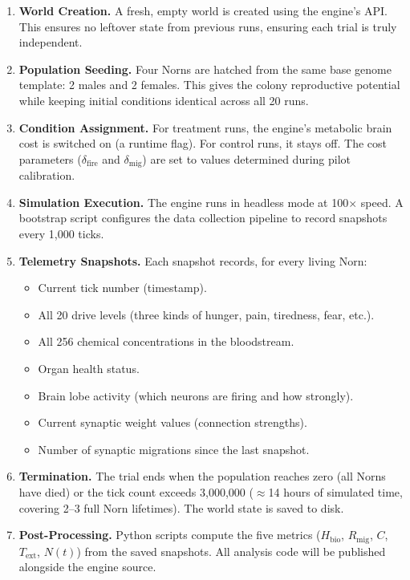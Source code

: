 \documentclass[12pt, a4paper]{article}
\newcommand{\Hbio}{H_{\mathrm{bio}}}
\newcommand{\Rmig}{R_{\mathrm{mig}}}
\begin{document}
\begin{enumerate}
  \item \textbf{World Creation.} A fresh, empty world is created using the engine's API. This ensures no leftover state from previous runs, ensuring each trial is truly independent.

  \item \textbf{Population Seeding.} Four Norns are hatched from the same base genome template: 2 males and 2 females. This gives the colony reproductive potential while keeping initial conditions identical across all 20 runs.

  \item \textbf{Condition Assignment.} For treatment runs, the engine's metabolic brain cost is switched on (a runtime flag). For control runs, it stays off. The cost parameters ($\delta_{\text{fire}}$ and $\delta_{\text{mig}}$) are set to values determined during pilot calibration.

  \item \textbf{Simulation Execution.} The engine runs in headless mode at 100$\times$ speed. A bootstrap script configures the data collection pipeline to record snapshots every 1{,}000 ticks.

  \item \textbf{Telemetry Snapshots.} Each snapshot records, for every living Norn:
    \begin{itemize}[nosep]
      \item Current tick number (timestamp).
      \item All 20 drive levels (three kinds of hunger, pain, tiredness, fear, etc.).
      \item All 256 chemical concentrations in the bloodstream.
      \item Organ health status.
      \item Brain lobe activity (which neurons are firing and how strongly).
      \item Current synaptic weight values (connection strengths).
      \item Number of synaptic migrations since the last snapshot.
    \end{itemize}

  \item \textbf{Termination.} The trial ends when the population reaches zero (all Norns have died) or the tick count exceeds 3{,}000{,}000 ($\approx$14 hours of simulated time, covering 2--3 full Norn lifetimes). The world state is saved to disk.

  \item \textbf{Post-Processing.} Python scripts compute the five metrics ($\Hbio$, $\Rmig$, $C$, $T_{\text{ext}}$, $N(t)$) from the saved snapshots. All analysis code will be published alongside the engine source.
\end{enumerate}
\end{document}
